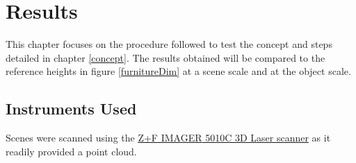 
\chapter{Results} %
\label{Chapter4}
\vspace{-5mm}
This chapter focuses on the procedure followed to test the concept and steps detailed in chapter \ref{concept}. The results obtained will be compared to the reference heights in figure \ref{furnitureDim} at a scene scale and at the object scale. 

\section{Instruments Used}
Scenes were scanned using the \href{http://www.zf-laser.com/Z-F-IMAGER-R-5010C.3d_laserscanner.0.html?&L=1}{Z+F IMAGER\textsuperscript{\textregistered} 5010C 3D Laser scanner} as it readily provided a point cloud.


